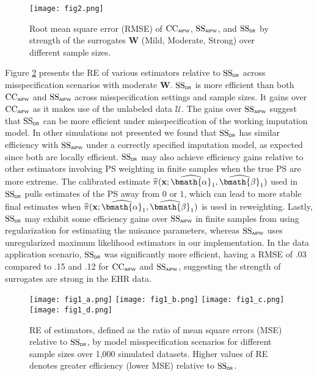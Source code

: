\documentclass[useAMS,referee,usenatbib]{biom}
\def\bx{\mathbf{x}}
\def\bW{\mathbf{W}}
\def\balphhat{\widehat{\bmath{\alpha}}}
\def\bbetahat{\widehat{\bmath{\beta}}}
\def\pihat{\widehat{\pi}}
\def\Uscr{\mathscr{U}}
\def\SSDR{\mbox{SS}_{\sf \scriptscriptstyle DR}}
\def\CCDR{\mbox{CC}_{\sf \scriptscriptstyle AIPW}}
\def\SSPrePost{\mbox{SS}_{\sf \scriptscriptstyle AIPW}}
\begin{document}
\begin{figure}[h!]
    \caption{
        Root mean square error (RMSE) of $\CCDR$, $\SSPrePost$, and $\SSDR$ by strength of the surrogates $\bW$ (Mild, Moderate, Strong) over 
        different sample sizes.
    }
    \label{fig:sev}
    \begin{center}
    \texttt{[image: fig2.png]}
    \end{center}
\end{figure}

Figure \ref{fig:re} presents the RE of various estimators relative to $\SSDR$ across misspecification scenarios with moderate $\bW$.  
$\SSDR$ is more efficient than both $\CCDR$ and $\SSPrePost$ across misspecification settings and sample sizes. It gains
over $\CCDR$ as it makes use of the unlabeled data $\Uscr$.  The gains over $\SSPrePost$ suggest that $\SSDR$ can be more efficient
under misspecification of the working imputation model.  In other simulations not presented we found that $\SSDR$ has
similar efficiency with $\SSPrePost$ under a correctly specified imputation model, as expected since both are locally efficient.  $\SSDR$ may also achieve efficiency gains
relative to other estimators involving PS weighting in finite samples when the true PS are more extreme. The calibrated
estimate $\pihat(\bx;\balphhat_1,\bbetahat_1)$ used in $\SSDR$ pulls estimates of the PS away from $0$ or $1$, which can 
lead to more stable final estimates when $\pihat(\bx;\balphhat_1,\bbetahat_1)$ is used in reweighting.  Lastly, $\SSDR$ 
may exhibit some efficiency gains over $\SSPrePost$ in finite samples from using regularization for estimating the nuisance 
parameters, whereas $\SSPrePost$ uses unregularized maximum likelihood estimators in our implementation.
In the data application scenario,
$\SSDR$ was significantly more efficient, having a RMSE of .03 compared to .15 and .12 for $\CCDR$ and $\SSPrePost$, suggesting
the strength of surrogates are strong in the EHR data.

\begin{figure}[h!]
\caption{RE of estimators, defined as the ratio of mean square errors (MSE) relative to $\SSDR$, by model misspecification scenarios for different sample sizes over 1,000 simulated datasets.  Higher values of RE denotes greater efficiency (lower MSE) relative to $\SSDR$.
}
\label{fig:re}
\begin{center}
\texttt{[image: fig1\_a.png]} \texttt{[image: fig1\_b.png]}
\texttt{[image: fig1\_c.png]} \texttt{[image: fig1\_d.png]}
\end{center}
\end{figure}
\end{document}
